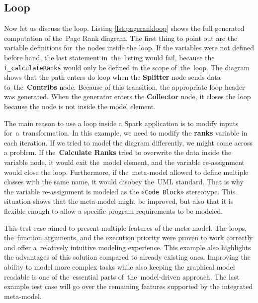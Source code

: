 \subsection*{Loop}

Now let us discuss the loop. Listing \ref{lst:pagerankloop} shows the full generated computation of the~Page Rank diagram. The first thing to point out are the variable definitions for~the nodes inside the loop. If the variables were not defined before hand, the last statement in~the~listing would fail, because the \texttt{t\_calculateRanks} would only be defined in the scope of~the~loop.
The diagram shows that the path enters do loop when the \textbf{Splitter} node sends data to~the~\textbf{Contribs} node. Because of this transition, the appropriate loop header was generated. When the generator enters the \textbf{Collector} node, it closes the loop because the node is not inside the model element. 


The main reason to use a loop inside a Spark application is to modify inputs for~a~transformation. In this example, we need to modify the \textbf{ranks} variable in each iteration. If we tried to model the diagram differently, we might come across a problem. If the~\textbf{Calculate Ranks} tried to overwrite the data inside the variable node, it would exit the~model element, and the variable re-assignment would close the loop. Furthermore, if the~meta-model allowed to define multiple classes with the same name, it would disobey the~UML standard. That is why the variable re-assignment is modeled as the \texttt{«Code Block»} stereotype. This situation shows that the meta-model might be improved, but also that it is flexible enough to allow a specific program requirements to be modeled.

This test case aimed to present multiple features of the meta-model. The loops, the~function arguments, and the execution priority were proven to work correctly and offer a~relatively intuitive modeling experience. This example also highlights the advantages of this solution compared to already existing ones. Improving the ability to model more complex tasks while also keeping the graphical model readable is one of the~essential parts of~the~model-driven approach. The last example test case will go over the remaining features supported by the integrated meta-model.


